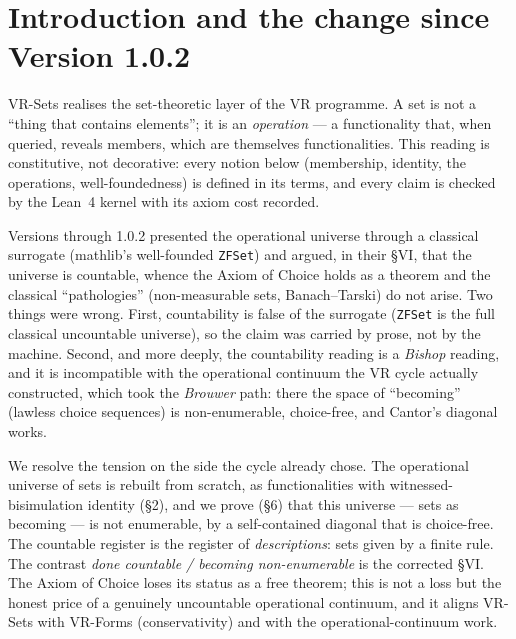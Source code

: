 \documentclass[11pt]{article}
\theoremstyle{remark}
\begin{document}
\tableofcontents

\section{Introduction and the change since Version 1.0.2}

VR-Sets realises the set-theoretic layer of the VR programme. A set is not a ``thing that contains
elements''; it is an \emph{operation} --- a functionality that, when queried, reveals members, which
are themselves functionalities. This reading is constitutive, not decorative: every notion below
(membership, identity, the operations, well-foundedness) is defined in its terms, and every claim is
checked by the Lean~4 kernel with its axiom cost recorded.

Versions through 1.0.2 presented the operational universe through a classical surrogate (mathlib's
well-founded \texttt{ZFSet}) and argued, in their \S VI, that the universe is countable, whence the
Axiom of Choice holds as a theorem and the classical ``pathologies'' (non-measurable sets,
Banach--Tarski) do not arise. Two things were wrong. First, countability is false of the surrogate
(\texttt{ZFSet} is the full classical uncountable universe), so the claim was carried by prose, not by
the machine. Second, and more deeply, the countability reading is a \emph{Bishop} reading, and it
is incompatible with the operational continuum the VR cycle actually constructed, which took the
\emph{Brouwer} path: there the space of ``becoming'' (lawless choice sequences) is non-enumerable,
choice-free, and Cantor's diagonal works.

We resolve the tension on the side the cycle already chose. The operational universe of sets is
rebuilt from scratch, as functionalities with witnessed-bisimulation identity (\S2), and we prove
(\S6) that this universe --- sets as becoming --- is not enumerable, by a self-contained diagonal
that is choice-free. The countable register is the register of \emph{descriptions}: sets given by a
finite rule. The contrast \emph{done countable / becoming non-enumerable} is the corrected \S VI.
The Axiom of Choice loses its status as a free theorem; this is not a loss but the honest price of a
genuinely uncountable operational continuum, and it aligns VR-Sets with VR-Forms (conservativity)
and with the operational-continuum work.
\end{document}
